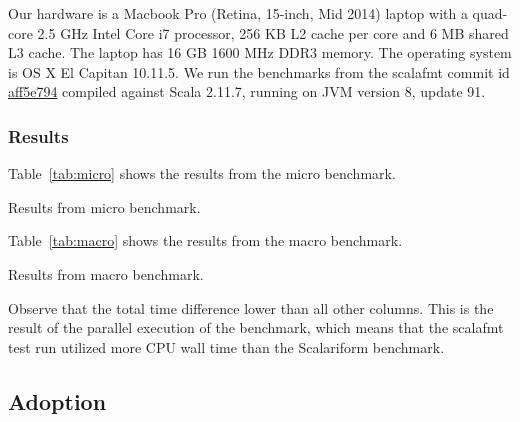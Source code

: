Our hardware is a Macbook Pro (Retina, 15-inch, Mid 2014) laptop with a quad-core 2.5 GHz Intel Core i7 processor, 256 KB L2 cache per core and 6 MB shared L3 cache.
The laptop has 16 GB 1600 MHz DDR3 memory.
The operating system is OS X El Capitan 10.11.5.
We run the benchmarks from the scalafmt commit id \href{https://github.com/olafurpg/scalafmt/tree/aff5e794dae4787b08243f8abb87a3ca4d907e40}{aff5e794} compiled against Scala 2.11.7, running on JVM version 8, update 91.

\subsubsection{Results}
Table~\ref{tab:micro} shows the results from the micro benchmark.
\begin{table}
  \centering
  
  \caption{Results from micro benchmark.}
\end{table}

Table~\ref{tab:macro} shows the results from the macro benchmark.
\begin{table}
  \centering
  
  \caption{Results from macro benchmark.}
\end{table}
Observe that the total time difference lower than all other columns.
This is the result of the parallel execution of the benchmark, which means that the scalafmt test run utilized more CPU wall time than the Scalariform benchmark.

\subsection{Adoption}\label{sec:adoption}



